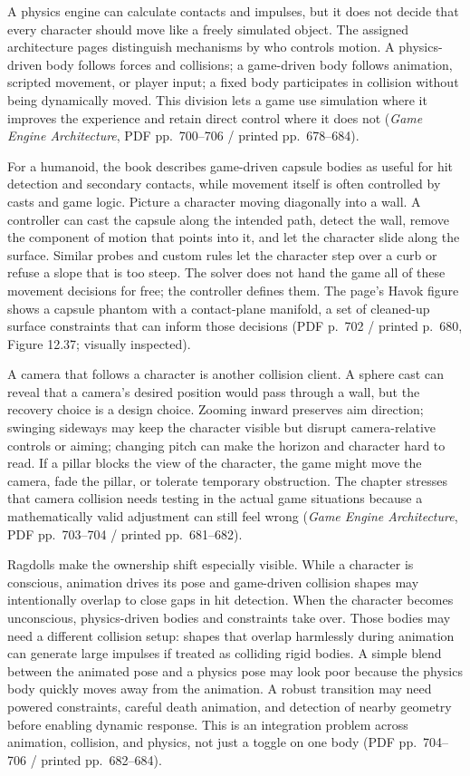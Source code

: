 A physics engine can calculate contacts and impulses, but it does not decide that every character should move like a freely simulated object. The assigned architecture pages distinguish mechanisms by who controls motion. A physics-driven body follows forces and collisions; a game-driven body follows animation, scripted movement, or player input; a fixed body participates in collision without being dynamically moved. This division lets a game use simulation where it improves the experience and retain direct control where it does not (\emph{Game Engine Architecture}, PDF pp.~700--706 / printed pp.~678--684).

For a humanoid, the book describes game-driven capsule bodies as useful for hit detection and secondary contacts, while movement itself is often controlled by casts and game logic. Picture a character moving diagonally into a wall. A controller can cast the capsule along the intended path, detect the wall, remove the component of motion that points into it, and let the character slide along the surface. Similar probes and custom rules let the character step over a curb or refuse a slope that is too steep. The solver does not hand the game all of these movement decisions for free; the controller defines them. The page's Havok figure shows a capsule phantom with a contact-plane manifold, a set of cleaned-up surface constraints that can inform those decisions (PDF p.~702 / printed p.~680, Figure 12.37; visually inspected).

A camera that follows a character is another collision client. A sphere cast can reveal that a camera's desired position would pass through a wall, but the recovery choice is a design choice. Zooming inward preserves aim direction; swinging sideways may keep the character visible but disrupt camera-relative controls or aiming; changing pitch can make the horizon and character hard to read. If a pillar blocks the view of the character, the game might move the camera, fade the pillar, or tolerate temporary obstruction. The chapter stresses that camera collision needs testing in the actual game situations because a mathematically valid adjustment can still feel wrong (\emph{Game Engine Architecture}, PDF pp.~703--704 / printed pp.~681--682).

Ragdolls make the ownership shift especially visible. While a character is conscious, animation drives its pose and game-driven collision shapes may intentionally overlap to close gaps in hit detection. When the character becomes unconscious, physics-driven bodies and constraints take over. Those bodies may need a different collision setup: shapes that overlap harmlessly during animation can generate large impulses if treated as colliding rigid bodies. A simple blend between the animated pose and a physics pose may look poor because the physics body quickly moves away from the animation. A robust transition may need powered constraints, careful death animation, and detection of nearby geometry before enabling dynamic response. This is an integration problem across animation, collision, and physics, not just a toggle on one body (PDF pp.~704--706 / printed pp.~682--684).

